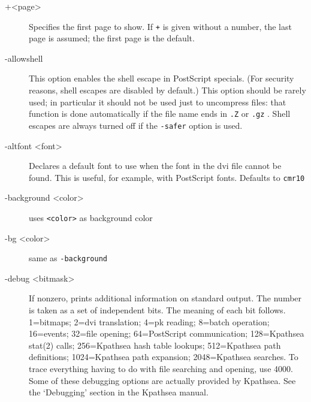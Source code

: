 \documentclass[a4paper,11pt]{article}
\begin{document}
\begin{description}
\item [+<page>] Specifies the first page to show.  If \texttt{+} is
  given without a number, the last page is assumed; the first page is
  the default.
\item[-allowshell] This option enables the shell escape in PostScript specials.
(For security reasons, shell escapes are disabled by default.)
This option should be rarely used; in particular it should not be used just
to uncompress files: that function is done automatically if the file name
ends in \verb|.Z| or \verb|.gz| . Shell escapes are always turned off if the
\verb|-safer| option is used.
\item[-altfont <font>] Declares a default font to use when the font in
  the dvi file cannot be found.  This is useful, for example, with
  PostScript fonts.  Defaults to \texttt{cmr10}
\item[-background <color>] uses \texttt{<color>} as background color
\item[-bg <color>] same as \texttt{-background} 
\item[-debug <bitmask>]If nonzero, prints additional information on
  standard output.  The number is taken as a set of independent bits.
  The meaning of each bit follows. 1=bitmaps; 2=dvi translation; 4=pk
  reading; 8=batch operation; 16=events; 32=file opening;
  64=PostScript communication; 128=Kpathsea stat(2) calls;
  256=Kpathsea hash table lookups; 512=Kpathsea path definitions;
  1024=Kpathsea path expansion; 2048=Kpathsea searches.  To trace
  everything having to do with file searching and opening, use 4000.
  Some of these debugging options are actually provided by Kpathsea.
  See the `Debugging' section in the Kpathsea manual.
  

\end{description}
\end{document}
